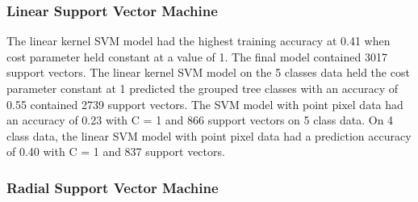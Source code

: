 \documentclass[12pt,twoside]{reedthesis}
\begin{document}
\hypertarget{linear-support-vector-machine}{%
\subsubsection{Linear Support Vector Machine}\label{linear-support-vector-machine}}

The linear kernel SVM model had the highest training accuracy at 0.41 when cost parameter held constant at a value of 1. The final model contained 3017 support vectors. The linear kernel SVM model on the 5 classes data held the cost parameter constant at 1 predicted the grouped tree classes with an accuracy of 0.55 contained 2739 support vectors. The SVM model with point pixel data had an accuracy of 0.23 with C = 1 and 866 support vectors on 5 class data. On 4 class data, the linear SVM model with point pixel data had a prediction accuracy of 0.40 with C = 1 and 837 support vectors.

\hypertarget{radial-support-vector-machine}{%
\subsubsection{Radial Support Vector Machine}\label{radial-support-vector-machine}}
\end{document}
